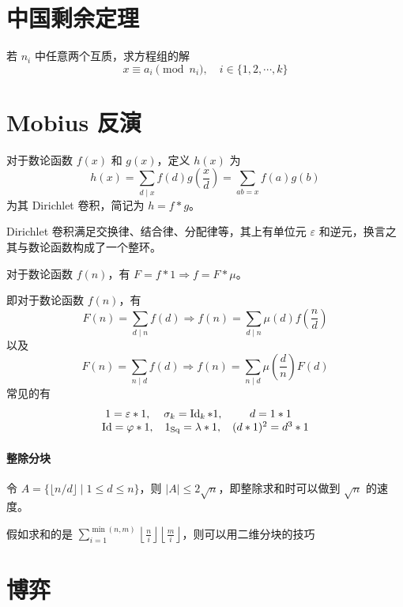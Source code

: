\documentclass{probook}
\begin{document}
\begin{multicols}{2}
\section{中国剩余定理}

若 $n_i$ 中任意两个互质，求方程组的解
\[ x \equiv a_i \pmod {n_i} , \quad i \in \{ 1,2,\cdots,k \} \]



\section{Mobius 反演}

对于数论函数 $f(x)$ 和 $g(x)$，定义 $h(x)$ 为
\[ h(x) = \sum_{d \mid x} f(d) g\left(\frac{x}{d}\right) = \sum_{ab = x} f(a)g(b) \]
为其 Dirichlet 卷积，简记为 $h = f \ast g$。

Dirichlet 卷积满足交换律、结合律、分配律等，其上有单位元 $\varepsilon$ 和逆元，换言之其与数论函数构成了一个整环。

对于数论函数 $f(n)$，有 $F = f \ast 1 \Rightarrow f = F \ast \mu$。

即对于数论函数 $f(n)$，有
\[ F(n) = \sum_{d \mid n} f(d) \Rightarrow f(n) = \sum_{d \mid n} \mu(d)f\left(\frac{n}{d}\right) \]
以及
\[ F(n) = \sum_{n \mid d} f(d) \Rightarrow f(n) = \sum_{n \mid d} \mu\left(\frac{d}{n}\right)F(d) \]
常见的有
\[ \begin{matrix}
    1 = \varepsilon \ast 1, & \sigma_k = \operatorname{Id}_k \ast 1,& d = 1 \ast 1 \\
    \operatorname{Id} = \varphi \ast 1, & 1_{\operatorname{Sq}} = \lambda \ast 1, &(d \ast 1)^2 = d^3 \ast 1
\end{matrix} \]

\paragraph{整除分块}
令 $A = \{ \lfloor n/d \rfloor \mid 1 \leqslant d \leqslant n \}$，则 $|A| \leqslant 2\sqrt{n}$，即整除求和时可以做到 $\sqrt{n}$ 的速度。



假如求和的是 $\sum\limits_{i=1}^{\min(n,m)} \left\lfloor \frac{n}{i} \right\rfloor\left\lfloor \frac{m}{i} \right\rfloor$，则可以用二维分块的技巧




\section{博弈}


\end{multicols}
\end{document}
